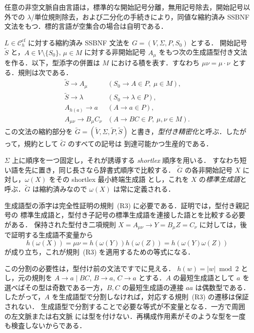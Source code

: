 \documentclass[11pt,a4paper]{ltjsarticle}
\theoremstyle{remark}
\theoremstyle{plain}
\newcommand{\cf}{\mathrm{cf}}
\newcommand{\Ccf}[1]{\mathcal C_{#1}^{\cf}}
\begin{document}
任意の非空文脈自由言語は，標準的な開始記号分離，無用記号除去，開始記号以外での $\lambda$/単位規則除去，および二分化の手続きにより，同値な縮約済み SSBNF 文法をもつ．標的言語が空集合の場合は自明である．

$L\in\Ccf{h}$ に対する縮約済み SSBNF 文法を $G=(V,\Sigma,P,S_0)$ とする．
開始記号 $\widetilde S$ と，$A\in V\setminus\{S_0\}$, $\mu\in M$ に対する非開始記号 $A_\mu$ をもつ次の生成語型付き文法を作る．以下，型添字の併置は $M$ における積を表す．すなわち $\mu\nu=\mu\cdot\nu$ とする．規則は次である．
\[
\begin{array}{ll}
\widetilde S\to A_\mu & (S_0\to A\in P,\ \mu\in M),\\
\widetilde S\to\lambda & (S_0\to\lambda\in P),\\
A_{h(a)}\to a & (A\to a\in P),\\
A_{\mu\nu}\to B_\mu C_\nu & (A\to BC\in P,\ \mu,\nu\in M).
\end{array}
\]
この文法の縮約部分を
$\widetilde G=(\widetilde V,\Sigma,\widetilde P,\widetilde S)$ と書き，\emph{型付き精密化}と呼ぶ．したがって，規約として $\widetilde G$ のすべての記号は
到達可能かつ生産的である．

$\Sigma$ 上に順序を一つ固定し，それが誘導する \emph{shortlex} 順序を用いる．
すなわち短い語を先に置き，同じ長さなら辞書式順序で比較する．
$\widetilde G$ の各非開始記号 $X$ に対し，$\omega(X)$ をその shortlex 最小終端生成語
とし，これを $X$ の\emph{標準生成語}と呼ぶ．$\widetilde G$ は縮約済みなので
$\omega(X)$ は常に定義される．

生成語型の添字は完全性証明の規則~(R3) に必要である．証明では，型付き親記号の
標準生成語と，型付き子記号の標準生成語を連接した語とを比較する必要がある．
保持された型付き二項規則
$X=A_{\mu\nu}\to Y=B_\mu Z=C_\nu$ に対しては，後で証明する生成語不変量から
\[
 h(\omega(X))=\mu\nu
 =h(\omega(Y))h(\omega(Z))
 =h(\omega(Y)\omega(Z))
\]
が成り立ち，これが規則~(R3) を適用するための等式になる．

この分割の必要性は，型付け前の文法ですでに見える．
$h(w)=|w|\bmod 2$ とし，元の規則を
$A\to a\mid BC$, $B\to a$, $C\to a$ とする．$A$ の最短生成語として $a$ を
選べばその型は奇数である一方，$B,C$ の最短生成語の連接 $aa$ は偶数型である．
したがって，$A$ を生成語型で分割しなければ，対応する規則~(R3) の遷移は保証されない．
生成語型で分割することで必要な等式が不変量となる．一方で周囲の左文脈または右文脈
には型を付けない．再構成作用素がそのような型を一度も検査しないからである．
\end{document}
